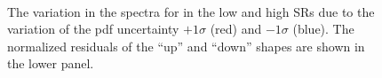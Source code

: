 \begin{figure}[h]
  \centering
   \\
  \caption{The variation in the \ptmiss spectra for \ttll in the low and high \mttll SRs due to the variation of the pdf uncertainty $+1\sigma$ (red) and $-1\sigma$ (blue). The normalized residuals of the ``up'' and ``down'' shapes are shown in the lower panel.}
  \label{fig:PDFshape}
\end{figure}

